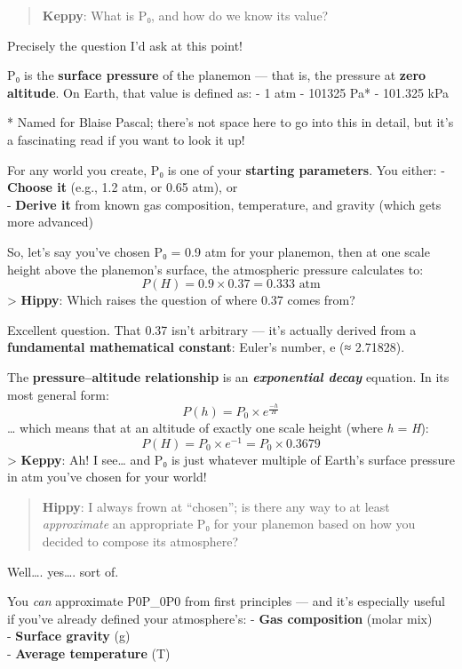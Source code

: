 \documentclass[
  letterpaper,
]{book}
\begin{document}
\begin{quote}
\textbf{Keppy}: What is P₀, and how do we know its value?
\end{quote}

Precisely the question I'd ask at this point!

P₀\hspace{0pt} is the \textbf{surface pressure} of the planemon --- that
is, the pressure at \textbf{zero altitude}. On Earth, that value is
defined as: - 1 atm - 101325 Pa* - 101.325 kPa

* Named for Blaise Pascal; there's not space here to go into this in
detail, but it's a fascinating read if you want to look it up!

For any world you create, P₀\hspace{0pt} is one of your \textbf{starting
parameters}. You either: - \textbf{Choose it} (e.g., 1.2 atm, or 0.65
atm), or\\
- \textbf{Derive it} from known gas composition, temperature, and
gravity (which gets more advanced)

So, let's say you've chosen P₀ = 0.9 atm for your planemon, then at one
scale height above the planemon's surface, the atmospheric pressure
calculates to: \[
P(H) = 0.9 \times 0.37 = 0.333\text{ atm}
\] \textgreater{} \textbf{Hippy}: Which raises the question of where
0.37 comes from?

Excellent question. That 0.37 isn't arbitrary --- it's actually derived
from a \textbf{fundamental mathematical constant}: Euler's number, e (≈
2.71828).

The \textbf{pressure--altitude relationship} is an
\textbf{\emph{exponential decay}} equation. In its most general form: \[
P(h) = P_0 \times e^{\frac{-h}{H}}
\] \ldots{} which means that at an altitude of exactly one scale height
(where \emph{h} = \emph{H}): \[
P(H) = P_0 \times e^{-1} = P_0 \times 0.3679 
\] \textgreater{} \textbf{Keppy}: Ah! I see\ldots{} and P₀ is just
whatever multiple of Earth's surface pressure in atm you've chosen for
your world!

\begin{quote}
\textbf{Hippy}: I always frown at ``chosen''; is there any way to at
least \emph{approximate} an appropriate P₀ for your planemon based on
how you decided to compose its atmosphere?
\end{quote}

Well\ldots. yes\ldots. sort of.

You \emph{can} approximate P0P\_0P0\hspace{0pt} from first principles
--- and it's especially useful if you've already defined your
atmosphere's: - \textbf{Gas composition} (molar mix)\\
- \textbf{Surface gravity} (g)\\
- \textbf{Average temperature} (T)
\end{document}
